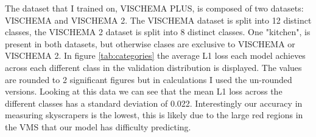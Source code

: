 \documentclass{UoYCSproject}
\begin{document}
The dataset that I trained on, VISCHEMA PLUS, is composed of two datasets: VISCHEMA and VISCHEMA 2. The VISCHEMA dataset is split into 12 distinct classes, the VISCHEMA 2 dataset is split into 8 distinct classes. One "kitchen", is present in both datasets, but otherwise clases are exclusive to VISCHEMA or VISCHEMA 2. In figure \ref{tab:categories} the average L1 loss each model achieves across each different class in the validation distribution is displayed. The values are rounded to 2 significant figures but in calculations I used the un-rounded versions. Looking at this data we can see that the mean L1 loss across the different classes has a standard deviation of 0.022. Interestingly our accuracy in measuring skyscrapers is the lowest, this is likely due to the large red regions in the VMS that our model has difficulty predicting.




\end{document}
